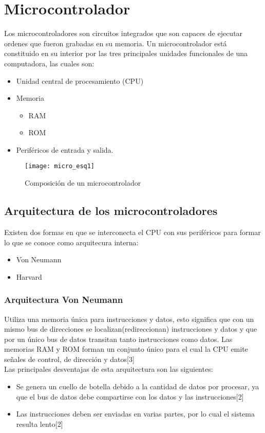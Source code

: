 \chapter{Microcontrolador}
 Los microcontroladores son circuitos integrados que son capaces de ejecutar ordenes que fueron grabadas en su memoria. Un microcontrolador está constituido en su interior por las tres principales unidades funcionales de una computadora, las cuales son: 
 \begin{itemize}
 \item Unidad central de procesamiento (CPU)
 \item Memoria 
 \begin{itemize}
     \item RAM
     \item ROM 
 \end{itemize}
\item Periféricos de entrada y salida.
\end{itemize}

\begin{figure}[h]
    \centering
    \texttt{[image: micro\_esq1]}
    \caption{Composición de un microcontrolador}
    \label{fig:mesh1}
\end{figure}

\section{Arquitectura de los microcontroladores}
Existen dos formas en que se interconecta el CPU con sus periféricos para formar lo que se conoce como arquitecura interna: 
 \begin{itemize}
     \item Von Neumann
     \item Harvard 
\end{itemize}

\subsection{Arquitectura Von Neumann}
Utiliza una memoria única para instrucciones y datos, esto significa que con un mismo bus de direcciones se localizan(redireccionan) instrucciones y datos y que por un único bus de datos transitan tanto instrucciones como datos. Las memorias RAM y ROM forman un conjunto único para el cual la CPU emite señales de control, de dirección y datos[3] \\

Las principales desventajas de esta arquitectura son las siguientes:
\begin{itemize}
    \item Se genera un cuello de botella debido a la cantidad de datos por procesar, ya que el bus de datos debe compartirse con los datos y las instrucciones[2]
    \item Las instrucciones deben ser enviadas en varias partes, por lo cual el sistema resulta lento[2]
\end{itemize}

